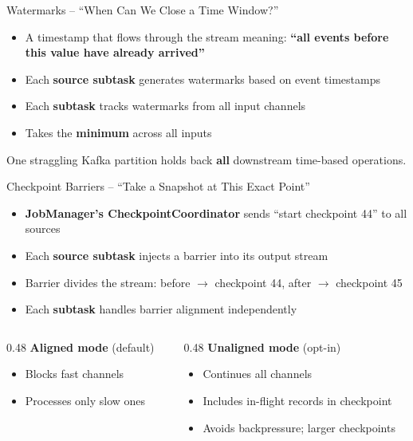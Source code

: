 \documentclass[aspectratio=169]{beamer}
\begin{document}
\begin{frame}{Watermarks -- ``When Can We Close a Time Window?''}
    \begin{itemize}
        \item A timestamp that flows through the stream meaning: \textbf{``all events before this value have already arrived''}
        \item Each \textbf{source subtask} generates watermarks based on event timestamps
        \item Each \textbf{subtask} tracks watermarks from all input channels
        \item Takes the \textbf{minimum} across all inputs
    \end{itemize}

    \vspace{0.3cm}
    \colorbox{utu_blue!20}{\parbox{0.9\textwidth}{
        \centering
        One straggling Kafka partition holds back \textbf{all} downstream time-based operations.
    }}
\end{frame}

\begin{frame}{Checkpoint Barriers -- ``Take a Snapshot at This Exact Point''}
    \begin{itemize}
        \item \textbf{JobManager's CheckpointCoordinator} sends ``start checkpoint 44'' to all sources
        \item Each \textbf{source subtask} injects a barrier into its output stream
        \item Barrier divides the stream: before $\rightarrow$ checkpoint 44, after $\rightarrow$ checkpoint 45
        \item Each \textbf{subtask} handles barrier alignment independently
    \end{itemize}

    \vspace{0.2cm}
    \begin{columns}[T]
        \begin{column}{0.48\textwidth}
            \textbf{Aligned mode} (default)
            \begin{itemize}
                \item Blocks fast channels
                \item Processes only slow ones
            \end{itemize}
        \end{column}
        \begin{column}{0.48\textwidth}
            \textbf{Unaligned mode} (opt-in)
            \begin{itemize}
                \item Continues all channels
                \item Includes in-flight records in checkpoint
                \item Avoids backpressure; larger checkpoints
            \end{itemize}
        \end{column}
    \end{columns}
\end{frame}
\end{document}
